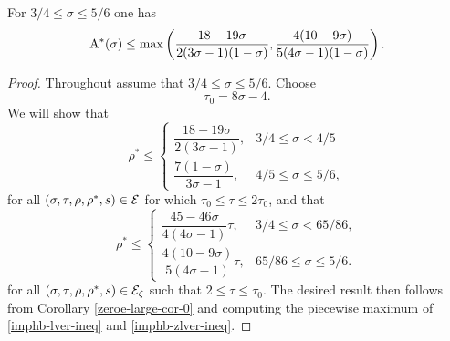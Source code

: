\begin{theorem}\label{imp-hb-energy-bound}
For $3/4 \le \sigma \le 5/6$ one has 
\[
\mathrm{A}^*(\sigma) \le \max\left(\frac{18 - 19\sigma}{2(3\sigma - 1)(1-\sigma)}, \frac{4(10 - 9\sigma)}{5(4\sigma - 1)(1 - \sigma)}\right).
\]
\end{theorem}

\derived 
{}

\begin{proof}
Throughout assume that $3/4 \le \sigma \le 5/6$. Choose 
\[
\tau_0 = 8\sigma - 4.
\]
We will show that
\begin{equation}\label{imphb-lver-ineq}
\rho^* \le \begin{cases}
\dfrac{18 - 19\sigma}{2(3\sigma - 1)},&3/4 \le \sigma < 4/5\\
\dfrac{7(1 - \sigma)}{3\sigma - 1},&4/5 \le \sigma \le 5/6,
\end{cases} 
\end{equation}
for all $(\sigma, \tau, \rho, \rho^*, s) \in \mathcal{E}$ for which $\tau_0 \le \tau \le 2\tau_0$, and that
\begin{equation}\label{imphb-zlver-ineq}
\rho^* \le \begin{cases}
\dfrac{45 - 46\sigma}{4(4\sigma - 1)}\tau,&3/4 \le \sigma < 65/86,\\
\dfrac{4(10 - 9\sigma)}{5(4\sigma - 1)}\tau,&65/86 \le \sigma \le 5/6.
\end{cases}
\end{equation}
for all $(\sigma, \tau, \rho, \rho^*, s) \in \mathcal{E}_\zeta$ such that $2 \le \tau \le \tau_0$. The desired result then follows from Corollary \ref{zeroe-large-cor-0} and computing the piecewise maximum of \eqref{imphb-lver-ineq} and \eqref{imphb-zlver-ineq}. 


\end{proof}

